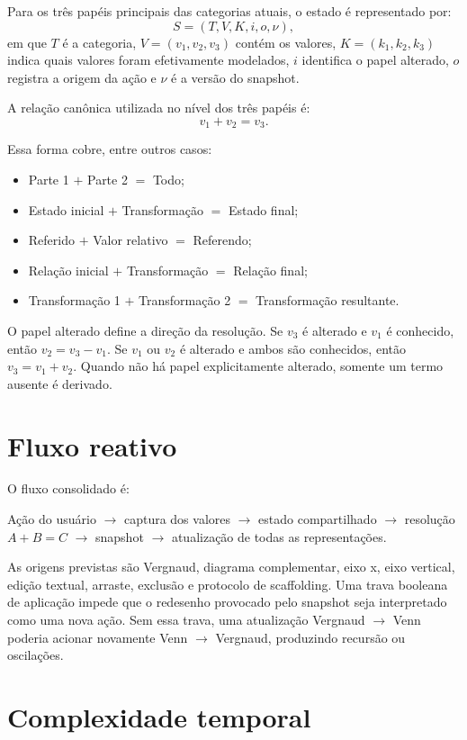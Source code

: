 \documentclass[12pt,a4paper]{article}
\begin{document}
Para os três papéis principais das categorias atuais, o estado é representado por:
\[
S = (T, V, K, i, o, \nu),
\]
em que $T$ é a categoria, $V=(v_1,v_2,v_3)$ contém os valores, $K=(k_1,k_2,k_3)$ indica quais valores foram efetivamente modelados, $i$ identifica o papel alterado, $o$ registra a origem da ação e $\nu$ é a versão do snapshot.

A relação canônica utilizada no nível dos três papéis é:
\[
v_1 + v_2 = v_3.
\]

Essa forma cobre, entre outros casos:
\begin{itemize}[noitemsep]
  \item Parte 1 $+$ Parte 2 $=$ Todo;
  \item Estado inicial $+$ Transformação $=$ Estado final;
  \item Referido $+$ Valor relativo $=$ Referendo;
  \item Relação inicial $+$ Transformação $=$ Relação final;
  \item Transformação 1 $+$ Transformação 2 $=$ Transformação resultante.
\end{itemize}

O papel alterado define a direção da resolução. Se $v_3$ é alterado e $v_1$ é conhecido, então $v_2=v_3-v_1$. Se $v_1$ ou $v_2$ é alterado e ambos são conhecidos, então $v_3=v_1+v_2$. Quando não há papel explicitamente alterado, somente um termo ausente é derivado.

\section{Fluxo reativo}

O fluxo consolidado é:

\begin{center}
Ação do usuário $\rightarrow$ captura dos valores $\rightarrow$ estado compartilhado $\rightarrow$ resolução $A+B=C$ $\rightarrow$ snapshot $\rightarrow$ atualização de todas as representações.
\end{center}

As origens previstas são Vergnaud, diagrama complementar, eixo x, eixo vertical, edição textual, arraste, exclusão e protocolo de scaffolding. Uma trava booleana de aplicação impede que o redesenho provocado pelo snapshot seja interpretado como uma nova ação. Sem essa trava, uma atualização Vergnaud $\rightarrow$ Venn poderia acionar novamente Venn $\rightarrow$ Vergnaud, produzindo recursão ou oscilações.

\section{Complexidade temporal}
\end{document}
